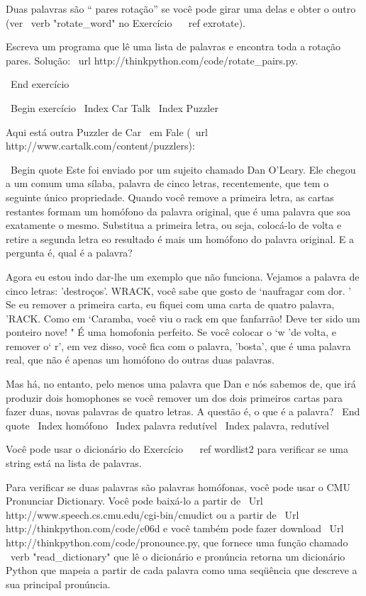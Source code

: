 \documentclass[10pt]{book}
\begin{document}
{{{{{{{Duas palavras são `` pares rotação'' se você pode girar uma delas
e obter o outro (ver \ verb "rotate_word" no Exercício ~ \ ref {exrotate}).

Escreva um programa que lê uma lista de palavras e encontra toda a rotação
pares. Solução: \ url {http://thinkpython.com/code/rotate_pairs.py}.

\ End {} exercício


\ Begin {} exercício
\ Index {Car Talk}
\ Index {} Puzzler

Aqui está outra Puzzler de {Car \ em
Fale} (\ url {http://www.cartalk.com/content/puzzlers}):

\ Begin {quote}
Este foi enviado por um sujeito chamado Dan O'Leary. Ele chegou a um comum
uma sílaba, palavra de cinco letras, recentemente, que tem o seguinte único
propriedade. Quando você remove a primeira letra, as cartas restantes formam
um homófono da palavra original, que é uma palavra que soa exatamente
o mesmo. Substitua a primeira letra, ou seja, colocá-lo de volta e retire
a segunda letra eo resultado é mais um homófono do
palavra original. E a pergunta é, qual é a palavra?

Agora eu estou indo dar-lhe um exemplo que não funciona. Vejamos
a palavra de cinco letras: 'destroços'. WRACK, você sabe que gosto de `naufragar com
dor. ' Se eu remover a primeira carta, eu fiquei com uma carta de quatro
palavra, 'RACK. Como em `Caramba, você viu o rack em que fanfarrão!
Deve ter sido um ponteiro nove! " É uma homofonia perfeito. Se você
colocar o `w 'de volta, e remover o` r', em vez disso, você fica com o
palavra, 'bosta', que é uma palavra real, que não é apenas um homófono do
outras duas palavras.

Mas há, no entanto, pelo menos uma palavra que Dan e nós sabemos de,
que irá produzir dois homophones se você remover um dos dois primeiros
cartas para fazer duas, novas palavras de quatro letras. A questão é, o que é
a palavra?
\ End {quote}
\ Index {} homófono
\ Index {palavra redutível}
\ Index {palavra, redutível}

Você pode usar o dicionário do Exercício ~ \ ref {} wordlist2 para verificar
se uma string está na lista de palavras.

Para verificar se duas palavras são palavras homófonas, você pode usar o CMU
Pronunciar Dictionary. Você pode baixá-lo a partir de
\ Url {http://www.speech.cs.cmu.edu/cgi-bin/cmudict} ou a partir de
\ Url {http://thinkpython.com/code/c06d} e você também pode fazer download
\ Url {http://thinkpython.com/code/pronounce.py}, que fornece uma função
chamado \ verb "read_dictionary" que lê o dicionário e pronúncia
retorna um dicionário Python que mapeia a partir de cada palavra como uma seqüência que
descreve a sua principal pronúncia.

}}}}}}}
\end{document}
